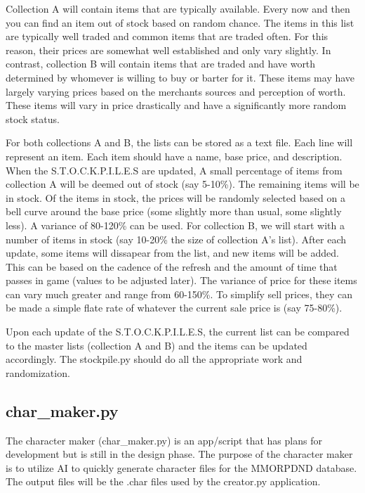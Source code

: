 Collection A will contain items that are typically available. Every now and then you can find an item out of stock based on random chance. The items in this list are typically well traded and common items that are traded often. For this reason, their prices are somewhat well established and only vary slightly. In contrast, collection B will contain items that are traded and have worth determined by whomever is willing to buy or barter for it. These items may have largely varying prices based on the merchants sources and perception of worth. These items will vary in price drastically and have a significantly more random stock status.

For both collections A and B, the lists can be stored as a text file. Each line will represent an item. Each item should have a name, base price, and description. When the S.T.O.C.K.P.I.L.E.S are updated, A small percentage of items from collection A will be deemed out of stock (say 5-10\%). The remaining items will be in stock. Of the items in stock, the prices will be randomly selected based on a bell curve around the base price (some slightly more than usual, some slightly less). A variance of 80-120\% can be used. For collection B, we will start with a number of items in stock (say 10-20\% the size of collection A's list). After each update, some items will dissapear from the list, and new items will be added. This can be based on the cadence of the refresh and the amount of time that passes in game (values to be adjusted later). The variance of price for these items can vary much greater and range from 60-150\%. To simplify sell prices, they can be made a simple flate rate of whatever the current sale price is (say 75-80\%). 

Upon each update of the S.T.O.C.K.P.I.L.E.S, the current list can be compared to the master lists (collection A and B) and the items can be updated accordingly. The stockpile.py should do all the appropriate work and randomization.

\subsection{char_maker.py}

The character maker (char_maker.py) is an app/script that has plans for development but is still in the design phase. The purpose of the character maker is to utilize AI to quickly generate character files for the MMORPDND database. The output files will be the .char files used by the creator.py application.

